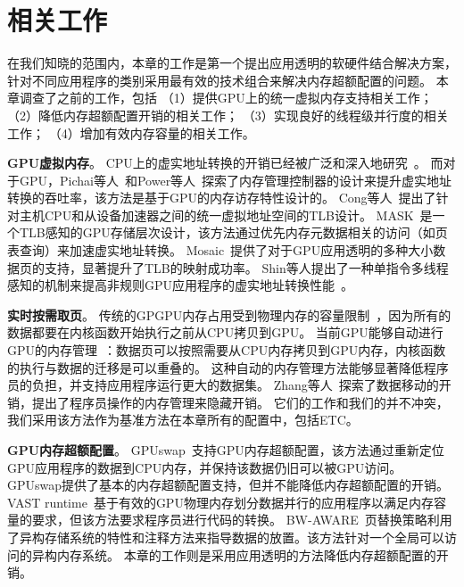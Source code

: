 \section{相关工作}
\label{sec:etcrelated}
在我们知晓的范围内，本章的工作是第一个提出应用透明的软硬件结合解决方案，针对不同应用程序的类别采用最有效的技术组合来解决内存超额配置的问题。
本章调查了之前的工作，包括
（1）提供GPU上的统一虚拟内存支持相关工作；
（2）降低内存超额配置开销的相关工作；
（3）实现良好的线程级并行度的相关工作；
（4）增加有效内存容量的相关工作。

\textbf{GPU虚拟内存}。
CPU上的虚实地址转换的开销已经被广泛和深入地研究~。
而对于GPU，Pichai等人~和Power等人~探索了内存管理控制器的设计来提升虚实地址转换的吞吐率，该方法是基于GPU的内存访存特性设计的。
Cong等人~提出了针对主机CPU和从设备加速器之间的统一虚拟地址空间的TLB设计。
MASK~是一个TLB感知的GPU存储层次设计，该方法通过优先内存元数据相关的访问（如页表查询）来加速虚实地址转换。
Mosaic~提供了对于GPU应用透明的多种大小数据页的支持，显著提升了TLB的映射成功率。
Shin等人提出了一种单指令多线程感知的机制来提高非规则GPU应用程序的虚实地址转换性能~。

\textbf{实时按需取页}。
传统的GPGPU内存占用受到物理内存的容量限制~，因为所有的数据都要在内核函数开始执行之前从CPU拷贝到GPU。
当前GPU能够自动进行GPU的内存管理~：数据页可以按照需要从CPU内存拷贝到GPU内存，内核函数的执行与数据的迁移是可以重叠的。
这种自动的内存管理方法能够显著降低程序员的负担，并支持应用程序运行更大的数据集。
Zhang等人~探索了数据移动的开销，提出了程序员操作的内存管理来隐藏开销。
它们的工作和我们的并不冲突，我们采用该方法作为基准方法在本章所有的配置中，包括ETC。

\textbf{GPU内存超额配置}。
GPUswap~支持GPU内存超额配置，该方法通过重新定位GPU应用程序的数据到CPU内存，并保持该数据仍旧可以被GPU访问。
GPUswap提供了基本的内存超额配置支持，但并不能降低内存超额配置的开销。
VAST runtime~基于有效的GPU物理内存划分数据并行的应用程序以满足内存容量的要求，但该方法要求程序员进行代码的转换。
BW-AWARE~页替换策略利用了异构存储系统的特性和注释方法来指导数据的放置。该方法针对一个全局可以访问的异构内存系统。
本章的工作则是采用应用透明的方法降低内存超额配置的开销。

